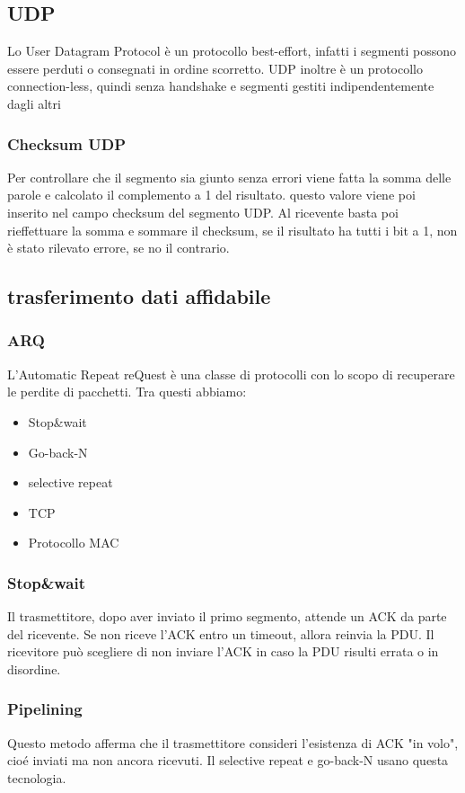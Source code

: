 \documentclass[12pt, a4paper]{article}
\begin{document}
\subsection{UDP}
Lo User Datagram Protocol è un protocollo best-effort, infatti i segmenti possono essere perduti o consegnati 
in ordine scorretto. UDP inoltre è un protocollo connection-less, quindi senza handshake e segmenti gestiti
indipendentemente dagli altri

\subsubsection{Checksum UDP}
Per controllare che il segmento sia giunto senza errori viene fatta la somma delle parole e calcolato il 
complemento a 1 del risultato. questo valore viene poi inserito nel campo checksum del segmento UDP. Al ricevente
basta poi rieffettuare la somma e sommare il checksum, se il risultato ha tutti i bit a 1, non è stato rilevato 
errore, se no il contrario. 

\subsection{trasferimento dati affidabile}
\subsubsection{ARQ}
L'Automatic Repeat reQuest è una classe di protocolli con lo scopo di recuperare le perdite di pacchetti.
Tra questi abbiamo:
\begin{itemize}
    \item Stop\&wait
    \item Go-back-N
    \item selective repeat
    \item TCP
    \item Protocollo MAC
\end{itemize}

\subsubsection*{Stop\&wait}
Il trasmettitore, dopo aver inviato il primo segmento, attende un ACK da parte del ricevente. Se non riceve
l'ACK entro un timeout, allora reinvia la PDU. Il ricevitore può scegliere di non inviare l'ACK in caso la PDU
risulti errata o in disordine.

\subsubsection*{Pipelining}
Questo metodo afferma che il trasmettitore consideri l'esistenza di ACK "in volo", cioé inviati ma non ancora 
ricevuti. Il selective repeat e go-back-N usano questa tecnologia. 
\end{document}
